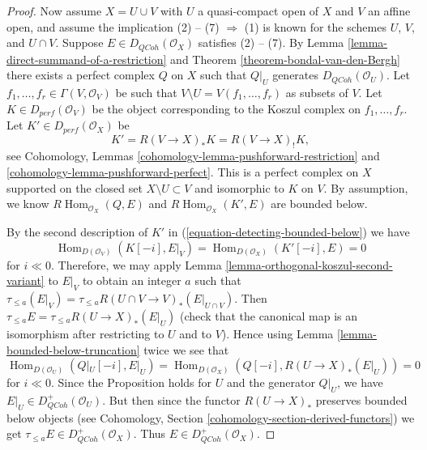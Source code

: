 \documentclass{stacks-project}
\theoremstyle{plain}
\theoremstyle{definition}
\theoremstyle{remark}
\numberwithin{equation}{subsection}
\def\Hom{\mathop{\mathrm{Hom}}\nolimits}
\def\QCoh{\mathit{QCoh}}
\begin{document}
\begin{proof}
\medskip\noindent
Now assume $X = U \cup V$ with $U$ a quasi-compact open of $X$ and
$V$ an affine open, and assume the implication (2) -- (7) $\Rightarrow$ (1)
is known for the schemes $U$, $V$, and $U \cap V$.
Suppose $E \in D_\QCoh(\mathcal{O}_X)$ satisfies (2) -- (7).
By Lemma \ref{lemma-direct-summand-of-a-restriction} and
Theorem \ref{theorem-bondal-van-den-Bergh} there exists a perfect
complex $Q$ on $X$ such that $Q|_U$ generates $D_\QCoh (\mathcal{O}_U)$. 
Let $f_1, \dots , f_r \in \Gamma (V, \mathcal{O}_V)$
be such that $V \setminus U = V(f_1, \dots , f_r)$ as subsets of
$V$. Let $K \in D_{perf}(\mathcal{O}_V)$ be the object
corresponding to the Koszul complex on $f_1, \dots , f_r$.
Let $K' \in D_{perf}(\mathcal{O}_X)$ be
\begin{equation}
\label{equation-detecting-bounded-below}
K' = R (V \to X)_* K = R (V \to X)_! K,
\end{equation}
see Cohomology, Lemmas \ref{cohomology-lemma-pushforward-restriction} and
\ref{cohomology-lemma-pushforward-perfect}. This is a perfect
complex on $X$ supported on the closed set $X \setminus U \subset V$
and isomorphic to $K$ on $V$. By assumption, we know
$R\Hom_{\mathcal{O}_X}(Q, E)$ and
$R\Hom_{\mathcal{O}_X}(K', E)$ are bounded below.

\medskip\noindent
By the second description of $K'$ in (\ref{equation-detecting-bounded-below})
we have
$$
\Hom_{D(\mathcal{O}_V)}(K[-i], E|_V) = \Hom_{D(\mathcal{O}_X)}(K'[-i], E) = 0
$$
for $i \ll 0$. Therefore, we may apply
Lemma \ref{lemma-orthogonal-koszul-second-variant} to $E|_V$ to
obtain an integer $a$ such that
$\tau_{\leq a}(E|_V) = \tau_{\leq a} R(U \cap V \to V)_*(E|_{U \cap V})$.
Then $\tau_{\leq a} E = \tau_{\leq a} R(U \to X)_*(E|_U)$
(check that the canonical map is an isomorphism after restricting to
$U$ and to $V$). Hence using Lemma \ref{lemma-bounded-below-truncation}
twice we see that
$$
\Hom_{D(\mathcal{O}_U)}(Q|_U [-i], E|_U) =
\Hom_{D(\mathcal{O}_X)}(Q[-i], R (U \to X)_* (E|_U)) = 0
$$
for $i \ll 0$. Since the Proposition holds for $U$ and the generator
$Q|_U$, we have $E|_U \in D^+_\QCoh (\mathcal{O}_U)$. But then since
the functor $R(U \to X)_*$ preserves bounded below objects
(see Cohomology, Section \ref{cohomology-section-derived-functors}) we get
$\tau_{\leq a} E \in D^+_\QCoh(\mathcal{O}_X)$. Thus 
$E \in D^+_\QCoh (\mathcal{O}_X)$.
\end{proof}
\end{document}
